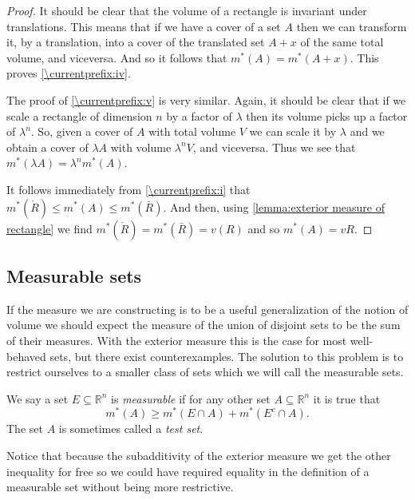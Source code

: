\documentclass[12pt,oneside]{book}
\newcommand{\localref}[1]{\ref{\currentprefix:#1}}
\numberwithin{table}{section}
\numberwithin{equation}{section}
\numberwithin{figure}{section}
\newcommand{\R}{\mathbb{R}}
\newcommand{\ext}[1]{m^* \! \left( #1 \right)}
\begin{document}
{\begin{proof}
		It should be clear that the volume of a rectangle is invariant under translations. This means that if we have a cover of a set \( A \) then we can transform it, by a translation, into a cover of the translated set \( A + x \) of the same total volume, and viceversa. And so it follows that \( \ext{A} = \ext{A + x} \). This proves \localref{iv}.

		The proof of \localref{v} is very similar. Again, it should be clear that if we scale a rectangle of dimension \( n \) by a factor of \( \lambda \) then its volume picks up a factor of \( \lambda^n \). So, given a cover of \( A \) with total volume \( V \) we can scale it by \( \lambda \) and we obtain a cover of \( \lambda A \) with volume \( \lambda^n V \), and viceversa. Thus we see that \( \ext{\lambda A} = \lambda^n \ext{A} \).

		It follows immediately from \localref{i} that \( \ext{\mathring{R}} \leq \ext{A} \leq \ext{\bar{R}} \). And then, using \cref{lemma:exterior measure of rectangle} we find \( \ext{\mathring{R}} = \ext{\bar{R}} = v(R) \) and so \( \ext{A} = v{R} \). 
	\end{proof}
}

\subsection{Measurable sets}
If the measure we are constructing is to be a useful generalization of the notion of volume we should expect the measure of the union of disjoint sets to be the sum of their measures. With the exterior measure this is the case for most well-behaved sets, but there exist counterexamples. The solution to this problem is to restrict ourselves to a smaller class of sets which we will call the measurable sets.
\begin{definition}
	We say a set \( E \subseteq \R^n \) is \emph{measurable} if for any other set \( A \subseteq \R^n \) it is true that
	\begin{equation*}
		\ext{A} \geq \ext{E \cap A} + \ext{E^c \cap A}.
	\end{equation*}
The set \( A \) is sometimes called a \emph{test set}.
\end{definition}

Notice that because the subadditivity of the exterior measure we get the other inequality for free so we could have required equality in the definition of a measurable set without being more restrictive.
\end{document}
